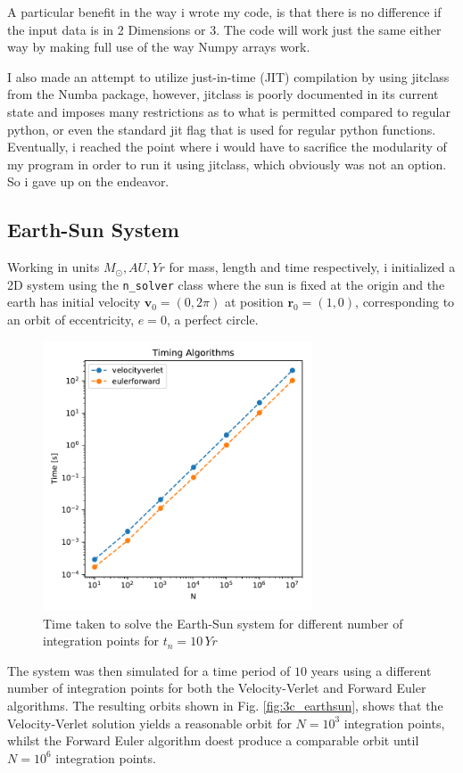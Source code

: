 \documentclass[10pt,showpacs,preprintnumbers,footinbib,amsmath,amssymb,aps,prl,twocolumn,groupedaddress,superscriptaddress,showkeys]{revtex4-1}
\begin{document}
    A particular benefit in the way i wrote my code, is that there is no difference if the input data is in 2 Dimensions or 3. The code will work just the same either way by making full use of the way Numpy arrays work.

    I also made an attempt to utilize just-in-time (JIT) compilation by using jitclass from the Numba package, however, jitclass is poorly documented in its current state and imposes many restrictions as to what is permitted compared to regular python, or even the standard jit flag that is used for regular python functions. Eventually, i reached the point where i would have to sacrifice the modularity of my program in order to run it using jitclass, which obviously was not an option. So i gave up on the endeavor.

  \subsection{Earth-Sun System}
    Working in units $M_\odot, AU, Yr$ for mass, length and time respectively, i initialized a 2D system using the \lstinline{n_solver} class where the sun is fixed at the origin and the earth has initial velocity $\mathbf v_0 = (0, 2\pi)$ at position $\mathbf r_0 = (1, 0)$, corresponding to an orbit of eccentricity, $e=0$, a perfect circle.

    \begin{figure}[h!]
      \center
      \includegraphics[width=8cm]{figs/timing_earthsun.pdf}
      \caption{Time taken to solve the Earth-Sun system for different number of integration points for $t_n=10\, Yr$}
    \end{figure}
    
    The system was then simulated for a time period of $10$ years using a different number of integration points for both the Velocity-Verlet and Forward Euler algorithms. The resulting orbits shown in Fig. \ref{fig:3c_earthsun}, shows that the Velocity-Verlet solution yields a reasonable orbit for $N=10^3$ integration points, whilst the Forward Euler algorithm doest produce a comparable orbit until $N=10^6$ integration points.
\end{document}
